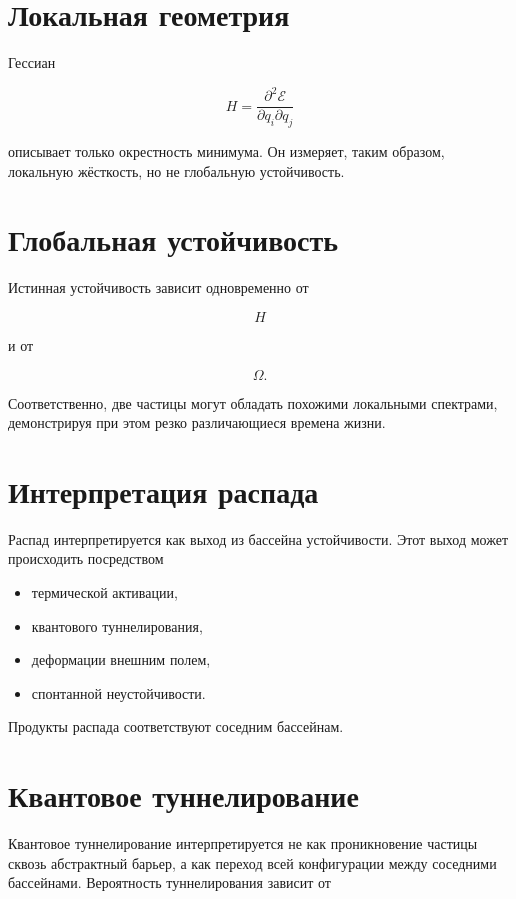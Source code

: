 \section{Локальная геометрия}

Гессиан

\[ H = \frac{\partial^2\mathcal E} {\partial q_i\partial q_j} \]

описывает только окрестность минимума. Он измеряет, таким образом, локальную жёсткость, но не глобальную устойчивость.

\section{Глобальная устойчивость}

Истинная устойчивость зависит одновременно от

\[ H \]

и от

\[ \Omega. \]

Соответственно, две частицы могут обладать похожими локальными спектрами, демонстрируя при этом резко различающиеся времена жизни.

\section{Интерпретация распада}

Распад интерпретируется как выход из бассейна устойчивости. Этот выход может происходить посредством

\begin{itemize}

\item термической активации,

\item квантового туннелирования,

\item деформации внешним полем,

\item спонтанной неустойчивости.

\end{itemize}

Продукты распада соответствуют соседним бассейнам.

\section{Квантовое туннелирование}

Квантовое туннелирование интерпретируется не как проникновение частицы сквозь абстрактный барьер, а как переход всей конфигурации между соседними бассейнами. Вероятность туннелирования зависит от

